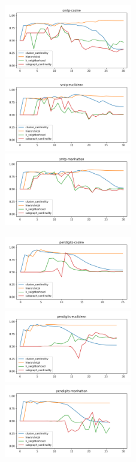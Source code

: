 \begin{figure}[!t]
\centering
\includegraphics[width=2.2in]{kdd/static/auc_vs_depth/smtp-cosine.png}
\includegraphics[width=2.2in]{kdd/static/auc_vs_depth/smtp-euclidean.png}
\includegraphics[width=2.2in]{kdd/static/auc_vs_depth/smtp-manhattan.png}

\includegraphics[width=2.2in]{kdd/static/auc_vs_depth/pendigits-cosine.png}
\includegraphics[width=2.2in]{kdd/static/auc_vs_depth/pendigits-euclidean.png}
\includegraphics[width=2.2in]{kdd/static/auc_vs_depth/pendigits-manhattan.png}


\end{figure}
